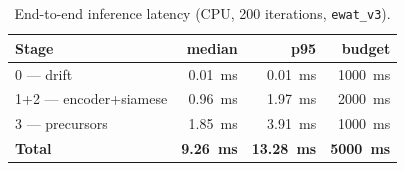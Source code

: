 \begin{table}[t]
\centering
\caption{End-to-end inference latency (CPU, 200 iterations, \texttt{ewat\_v3}).}
\label{tab:latency}
\small
\begin{tabularx}{\columnwidth}{@{}Xrrr@{}}
\toprule
\textbf{Stage} & \textbf{median} & \textbf{p95} & \textbf{budget} \\
\midrule
0 — drift               & 0.01~ms & 0.01~ms & 1000~ms \\
1+2 — encoder+siamese   & 0.96~ms & 1.97~ms & 2000~ms \\
3 — precursors          & 1.85~ms & 3.91~ms & 1000~ms \\
\midrule
\textbf{Total}          & \textbf{9.26~ms} & \textbf{13.28~ms} & \textbf{5000~ms} \\
\bottomrule
\end{tabularx}
\end{table}
